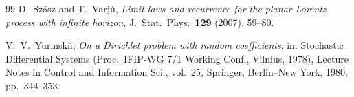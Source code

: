 \documentclass[11pt]{amsart}
\theoremstyle{plain}
\theoremstyle{definition}
\theoremstyle{remark}
\begin{document}
\begin{thebibliography}{99}
		D.~Sz\'asz and T.~Varj\'u,
		\emph{Limit laws and recurrence for the planar Lorentz process with infinite horizon},
		J.\ Stat.\ Phys.\ \textbf{129} (2007), 59--80.
		
		V.~V.~Yurinski\u{\i},
		\emph{On a Dirichlet problem with random coefficients},
		in: Stochastic Differential Systems (Proc.\ IFIP-WG 7/1 Working Conf., Vilnius, 1978), Lecture Notes in Control and Information Sci., vol.~25, Springer, Berlin--New York, 1980, pp.~344--353.
		
	\end{thebibliography}
	\enlargethispage{6\baselineskip}
\end{document}
